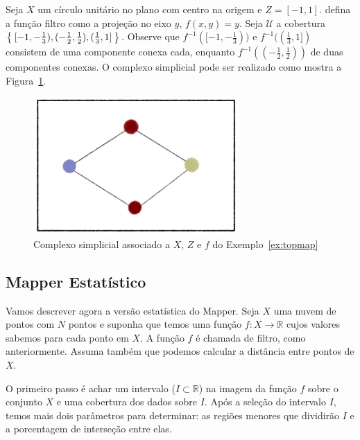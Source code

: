 \begin{ex}\label{ex:topmap}
    Seja $X$ um círculo unitário no plano com centro na origem e $Z=[-1,1]$. defina a função filtro como
    a projeção no eixo $y$, $f(x,y) = y$. Seja $\mathcal{U}$ a cobertura $\Set{[-1,-\frac{1}{3}), 
    (-\frac{1}{2},\frac{1}{2}), (\frac{1}{3}, 1]}$. Observe que $f^{-1}([-1,-\frac{1}{3}))$
    e $f^{-1}((\frac{1}{3}, 1])$  consistem de uma componente conexa cada, enquanto 
    $f^{-1}((-\frac{1}{2}, \frac{1}{2}))$ de duas componentes conexas. O complexo simplicial pode
    ser realizado como mostra a Figura~\ref{fig:topmap}.
    \begin{figure}
        \centering
        \includegraphics[width=0.7\textwidth]{images/topmap.png}
        \caption{Complexo simplicial associado a $X$, $Z$ e $f$ 
                 do Exemplo~\ref{ex:topmap}}
        \label{fig:topmap}
        \fautor
    \end{figure}
\end{ex}

\subsection{Mapper Estatístico} 

Vamos descrever agora a versão estatística do Mapper. Seja $X$ uma nuvem de pontos com $N$ pontos
e suponha que temos uma função $f \colon X \to \mathbb{R}$ cujos valores sabemos para cada ponto
em $X$. A função $f$ é chamada de filtro, como anteriormente. Assuma também que podemos calcular a 
distância entre pontos de $X$. 

O primeiro passo é achar um intervalo ($I \subset \mathbb{R}$) na imagem da função $f$ sobre o conjunto
$X$ e uma cobertura dos dados sobre $I$. Após a seleção do intervalo $I$, temos mais dois parâmetros 
para determinar: as regiões menores que dividirão $I$ e a porcentagem de interseção entre elas. 

